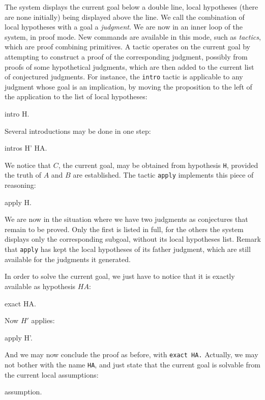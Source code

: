 \documentclass[11pt,a4paper]{book}
\begin{document}
The system displays the current goal below a double line, local hypotheses
(there are none initially) being displayed above the line. We call 
the combination of local hypotheses with a goal a {\sl judgment}.
We are now in an inner 
loop of the system, in proof mode. 
New commands are available in this
mode, such as {\sl tactics}, which are proof combining primitives.
A tactic operates on the current goal by attempting to construct a proof
of the corresponding judgment, possibly from proofs of some
hypothetical judgments, which are then added to the current
list of conjectured judgments.
For instance, the \verb:intro: tactic is applicable to any judgment
whose goal is an implication, by moving the proposition to the left
of the application to the list of local hypotheses:
\begin{coq_example}
intro H.
\end{coq_example}

Several introductions may be done in one step:
\begin{coq_example}
intros H' HA.
\end{coq_example}

We notice that $C$, the current goal, may be obtained from hypothesis
\verb:H:, provided the truth of $A$ and $B$ are established.
The tactic \verb:apply: implements this piece of reasoning:
\begin{coq_example}
apply H.
\end{coq_example}

We are now in the situation where we have two judgments as conjectures
that remain to be proved. Only the first is listed in full, for the
others the system displays only the corresponding subgoal, without its
local hypotheses list. Remark that \verb:apply: has kept the local
hypotheses of its father judgment, which are still available for
the judgments it generated.

In order to solve the current goal, we just have to notice that it is
exactly available as hypothesis $HA$:
\begin{coq_example}
exact HA.
\end{coq_example}

Now $H'$ applies:
\begin{coq_example}
apply H'.
\end{coq_example}

And we may now conclude the proof as before, with \verb:exact HA.:
Actually, we may not bother with the name \verb:HA:, and just state that
the current goal is solvable from the current local assumptions:
\begin{coq_example}
assumption.
\end{coq_example}
\end{document}
